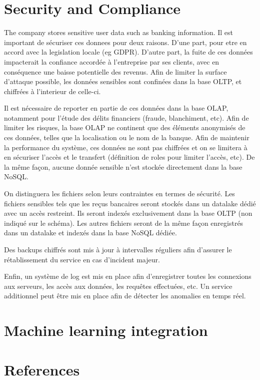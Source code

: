 \documentclass[11pt,a4paper,computermodern]{article}
\begin{document}
\section*{Security and Compliance}

The company stores sensitive user data such as banking information. Il est important de sécuriser ces donnees pour deux raisons. D'une part, pour etre en accord avec la legislation locale (eg GDPR). D'autre part, la fuite de ces données impacterait la confiance accordée à l'entreprise par ses clients, avec en conséquence une baisse potentielle des revenus. Afin de limiter la surface d'attaque possible, les données sensibles sont confinées dans la base OLTP, et chiffrées à l'interieur de celle-ci.

Il est nécessaire de reporter en partie de ces données dans la base OLAP, notamment pour l'étude des délits financiers (fraude, blanchiment, etc). Afin de limiter les risques, la base OLAP ne continent que des éléments anonymisés de ces données, telles que la localisation ou le nom de la banque. Afin de maintenir la performance du système, ces données ne sont pas chiffrées et on se limitera à en sécuriser l'accès et le transfert (définition de roles pour limiter l'accès, etc). De la même façon, aucune donnée sensible n'est stockée directement dans la base NoSQL.

On distinguera les fichiers selon leurs contraintes en termes de sécurité. Les fichiers sensibles tels que les reçus bancaires seront stockés dans un datalake dédié avec un accès restreint. Ils seront indexés exclusivement dans la base OLTP (non indiqué sur le schéma). Les autres fichiers seront de la même façon enregistrés dans un datalake et indexés dans la base NoSQL dédiée.

Des backups chiffrés sont mis à jour à intervalles réguliers afin d'assurer le rétablissement du service en cas d'incident majeur.

Enfin, un système de log est mis en place afin d'enregistrer toutes les connexions aux serveurs, les accès aux données, les requêtes effectuées, etc. Un service additionnel peut être mis en place afin de détecter les anomalies en temps réel.


\section*{Machine learning integration}



\vspace{.0cm}
\section*{References}
\end{document}
